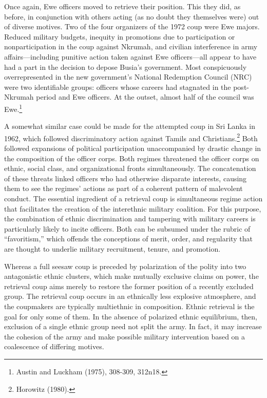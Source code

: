 \documentclass[
  letterpaper,
  DIV=11,
  numbers=noendperiod]{scrartcl}
\begin{document}
Once again, Ewe officers moved to retrieve their position. This they
did, as before, in conjunction with others acting (as no doubt they
themselves were) out of diverse motives. Two of the four organizers of
the 1972 coup were Ewe majors. Reduced military budgets, inequity in
promotions due to participation or nonparticipation in the coup against
Nkrumah, and civilian interference in army affairs---including punitive
action taken against Ewe officers---all appear to have had a part in the
decision to depose Busia's government. Most conspicuously
overrepresented in the new government's National Redemption Council
(NRC) were two identifiable groups: officers whose careers had stagnated
in the post-Nkrumah period and Ewe officers. At the outset, almost half
of the council was Ewe.\footnote{Austin and Luckham (1975), 308-309,
  312n18.}

A somewhat similar case could be made for the attempted coup in Sri
Lanka in 1962, which followed discriminatory action against Tamils and
Christians.\footnote{Horowitz (1980).} Both followed expansions of
political participation unaccompanied by drastic change in the
composition of the officer corps. Both regimes threatened the officer
corps on ethnic, social class, and organizational fronts simultaneously.
The concatenation of these threats linked officers who had otherwise
disparate interests, causing them to see the regimes' actions as part of
a coherent pattern of malevolent conduct. The essential ingredient of a
retrieval coup is simultaneous regime action that facilitates the
creation of the interethnic military coalition. For this purpose, the
combination of ethnic discrimination and tampering with military careers
is particularly likely to incite officers. Both can be subsumed under
the rubric of ``favoritism,'' which offends the conceptions of merit,
order, and regularity that are thought to underlie military recruitment,
tenure, and promotion.

Whereas a full seesaw coup is preceded by polarization of the polity
into two antagonistic ethnic clusters, which make mutually exclusive
claims on power, the retrieval coup aims merely to restore the former
position of a recently excluded group. The retrieval coup occurs in an
ethnically less explosive atmosphere, and the coupmakers are typically
multiethnic in composition. Ethnic retrieval is the goal for only some
of them. In the absence of polarized ethnic equilibrium, then, exclusion
of a single ethnic group need not split the army. In fact, it may
increase the cohesion of the army and make possible military
intervention based on a coalescence of differing motives.
\end{document}
